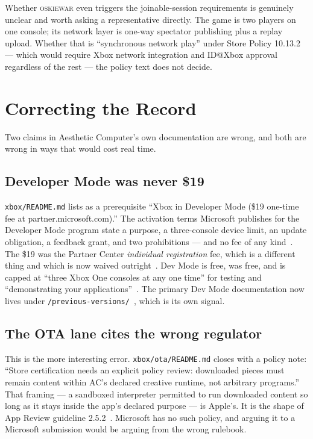 \documentclass[10pt,letterpaper,twocolumn]{article}
\newcommand{\game}{\textsc{oskiewar}}
\newcommand{\code}[1]{\texttt{#1}}
\begin{document}
Whether \game{} even triggers the joinable-session requirements is genuinely unclear and worth asking a representative directly. The game is two players on one console; its network layer is one-way spectator publishing plus a replay upload. Whether that is ``synchronous network play'' under Store Policy 10.13.2 --- which would require Xbox network integration and ID@Xbox approval regardless of the rest --- the policy text does not decide.

\section{Correcting the Record}

Two claims in Aesthetic Computer's own documentation are wrong, and both are wrong in ways that would cost real time.

\subsection{Developer Mode was never \$19}

\code{xbox/README.md} lists as a prerequisite ``Xbox in Developer Mode (\$19 one-time fee at partner.microsoft.com).'' The activation terms Microsoft publishes for the Developer Mode program state a purpose, a three-console device limit, an update obligation, a feedback grant, and two prohibitions --- and no fee of any kind~\cite{msDevMode}. The \$19 was the Partner Center \emph{individual registration} fee, which is a different thing and which is now waived outright~\cite{msIndividualFee}. Dev Mode is free, was free, and is capped at ``three Xbox One consoles at any one time'' for testing and ``demonstrating your applications''~\cite{msDevMode}. The primary Dev Mode documentation now lives under \code{/previous-versions/}~\cite{msDevkitActivation}, which is its own signal.

\subsection{The OTA lane cites the wrong regulator}
\label{sec:ota}

This is the more interesting error. \code{xbox/ota/README.md} closes with a policy note: ``Store certification needs an explicit policy review: downloaded pieces must remain content within AC's declared creative runtime, not arbitrary programs.'' That framing --- a sandboxed interpreter permitted to run downloaded content so long as it stays inside the app's declared purpose --- is Apple's. It is the shape of App Review guideline 2.5.2~\cite{appleGuidelines}. Microsoft has no such policy, and arguing it to a Microsoft submission would be arguing from the wrong rulebook.
\end{document}
